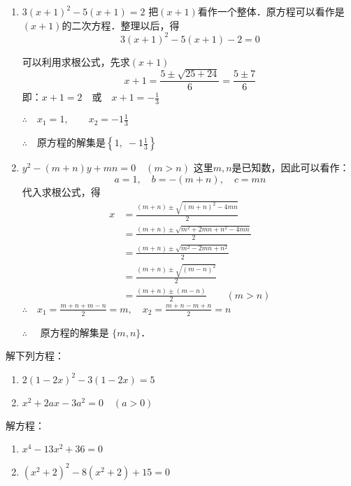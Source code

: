 \begin{solution}
\begin{enumerate}
    \item $3(x+1)^2-5(x+1)=2$
    把$(x+1)$看作一个整体．原方程可以看作是
    $(x+1)$的二次方程．整理以后，得
   \[3(x+1)^2-5(x+1)-2=0\] 

   可以利用求根公式，先求$(x+1)$
\[x+1=\frac{5\pm \sqrt{25+24}}{6}=\frac{5\pm 7}{6}\]
即：$x+1=2\quad \text{或}\quad x+1=-\frac{1}{3}$

$\therefore\quad x_1=1,\qquad x_2=-1\frac{1}{3}$

$\therefore\quad$原方程的解集是$\left\{1,\; -1\frac{1}{3}\right\}$

\item $y^2-(m+n)y+mn=0\quad (m>n)$
这里$m,n$是已知数，因此可以看作：
\[a=1,\quad b=-(m+n),\quad c=mn\]
代入求根公式，得
\[\begin{split}
        x &=\frac{(m+n) \pm \sqrt{(m+n)^{2}-4 m n}}{2} \\
        &=\frac{(m+n) \pm \sqrt{m^{2}+2 m n+n^{2}-4 m n}}{2} \\
        &=\frac{(m+n) \pm \sqrt{m^{2}-2 m n+n^{2}}}{2} \\
        &=\frac{(m+n) \pm \sqrt{(m-n)^{2}}}{2}\\
        &=\frac{(m+n) \pm(m-n)}{2} \qquad (m>n)
\end{split}\]
$\therefore\quad x_1=\frac{m+n+m-n}{2}=m,\quad x_2=\frac{m+n-m+n}{2}=n$

$\therefore\quad $ 原方程的解集是 $\{m,n\}$．
    \end{enumerate}
\end{solution}

\begin{ex}
    解下列方程：
    \begin{enumerate}
        \item $2(1-2x)^2-3(1-2x)=5$
        \item $x^2+2ax-3a^2=0\quad  (a>0)$
    \end{enumerate}
\end{ex}


\begin{example}
    解方程：
\begin{enumerate}
    \item $x^4-13x^2+36=0$
    \item $(x^2+2)^2-8(x^2+2)+15=0$
\end{enumerate}
\end{example}

